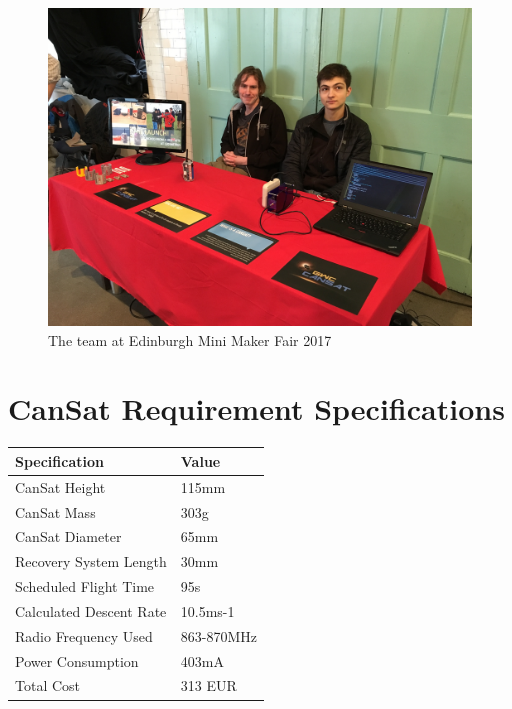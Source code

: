 \documentclass[]{report}
\begin{document}
\begin{figure}[h]
	\hfill\includegraphics[scale=0.1]{mfaire.jpg}\hspace*{\fill}
	\caption{The team at Edinburgh Mini Maker Fair 2017}
	\label{mfair}
\end{figure}


\chapter{CanSat Requirement Specifications}

\begin{center}
\begin{tabular}{ll}
	Specification          & Value      \\ \hline
	CanSat Height           & 115mm      \\
	CanSat Mass             & 303g       \\
	CanSat Diameter         & 65mm       \\
	Recovery System Length  & 30mm       \\
	Scheduled Flight Time   & 95s        \\
	Calculated Descent Rate & 10.5ms-1   \\
	Radio Frequency Used    & 863-870MHz \\
	Power Consumption       & 403mA      \\
	Total Cost              & 313 EUR    \\
\end{tabular}
\end{center}
\end{document}
